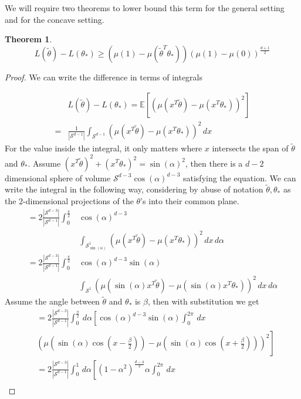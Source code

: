 \documentclass[twoside]{article} \usepackage{aistats2017}
\newcommand{\EV}[1] {
  \mathbb{E}\left[#1\right]}
\newtheorem{theorem}{Theorem}
\begin{document}
We will require two theorems to lower bound this term for the general setting and for the concave setting.
\begin{theorem}
$$L(\tilde{\theta})-L(\theta_*) \geq (\mu(1)-\mu(\tilde{\theta}^T\theta_*))(\mu(1)-\mu(0))^{\frac{d+1}{2}}$$
\end{theorem}
\begin{proof}
We can write the difference in terms of integrals

\begin{align*}
    &L(\tilde{\theta})-L(\theta_*)=\EV{(\mu(x^T\tilde{\theta})-\mu(x^T\theta_*))^2}\\
    =&\frac{1}{|\mathcal{S}^{d-1}|}\int_{\mathcal{S}^{d-1}}\left(\mu(x^T\tilde{\theta})-\mu(x^T\theta_*)\right)^2\, dx
\end{align*}
For the value inside the integral, it only matters where $x$ intersects the span of $\tilde{\theta}$ and $\theta_*$. Assume $(x^T\tilde{\theta})^2+(x^T\theta_*)^2 = \sin(\alpha)^2$, then there is a $d-2$ dimensional sphere of volume $\mathcal{S}^{d-3}\cos(\alpha)^{d-3}$ satisfying the equation. We can write the integral in the following way, considering by abuse of notation $\tilde{\theta},\theta_*$ as the $2$-dimensional projections of the $\theta$'s into their common plane.
\begin{align*}
    =2\frac{|\mathcal{S}^{d-3}|}{|\mathcal{S}^{d-1}|}\int_{0}^{\frac{\pi}{2}}&\cos(\alpha)^{d-3}\\
    &\int_{\mathcal{S}^1_{\sin(\alpha)}}\left(\mu(x^T\tilde{\theta})-\mu(x^T\theta_*)\right)^2\, dx\,d\alpha\nonumber\\
    =2\frac{|\mathcal{S}^{d-3}|}{|\mathcal{S}^{d-1}|}\int_{0}^{\frac{\pi}{2}}&\cos(\alpha)^{d-3}\sin(\alpha)\nonumber\\
    &\int_{\mathcal{S}^1}\left(\mu(\sin(\alpha)x^T\tilde{\theta})-\mu(\sin(\alpha)x^T\theta_*)\right)^2\, dx\,d\alpha\nonumber
\end{align*}    
    Assume the angle between $\tilde{\theta}$ and $\theta_*$ is $\beta$, then with substitution we get
    \begin{align}
        &=2\frac{|\mathcal{S}^{d-3}|}{|\mathcal{S}^{d-1}|}\int_{0}^{\frac{\pi}{2}}\,d\alpha\left[\cos(\alpha)^{d-3}\sin(\alpha)\int_{0}^{2\pi}\, dx\right.\nonumber\\
    &\left.\left(\mu(\sin(\alpha)\cos(x-\frac{\beta}{2}))-\mu(\sin(\alpha)\cos(x+\frac{\beta}{2}))\right)^2\right]\nonumber\\
        &=2\frac{|\mathcal{S}^{d-3}|}{|\mathcal{S}^{d-1}|}\int_{0}^{1}\,d\alpha\left[(1-\alpha^2)^{\frac{d-4}{2}}\alpha\int_{0}^{2\pi}\, dx\right.\nonumber\\

\end{align}
\end{proof}
\end{document}
